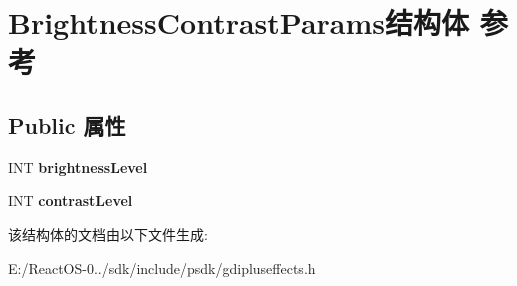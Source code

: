 \hypertarget{struct_brightness_contrast_params}{}\section{Brightness\+Contrast\+Params结构体 参考}
\label{struct_brightness_contrast_params}
\subsection*{Public 属性}
\begin{DoxyCompactItemize}
\item 
\mbox{\label{struct_brightness_contrast_params_a4f3b2a90cea78f82de0b047d3e2e8b7e}} 
I\+NT {\bfseries brightness\+Level}
\item 
\mbox{\label{struct_brightness_contrast_params_a92f3f3204eece0652544349b166aab0e}} 
I\+NT {\bfseries contrast\+Level}
\end{DoxyCompactItemize}


该结构体的文档由以下文件生成\+:\begin{DoxyCompactItemize}
\item 
E\+:/\+React\+O\+S-\/0../sdk/include/psdk/gdipluseffects.\+h\end{DoxyCompactItemize}
